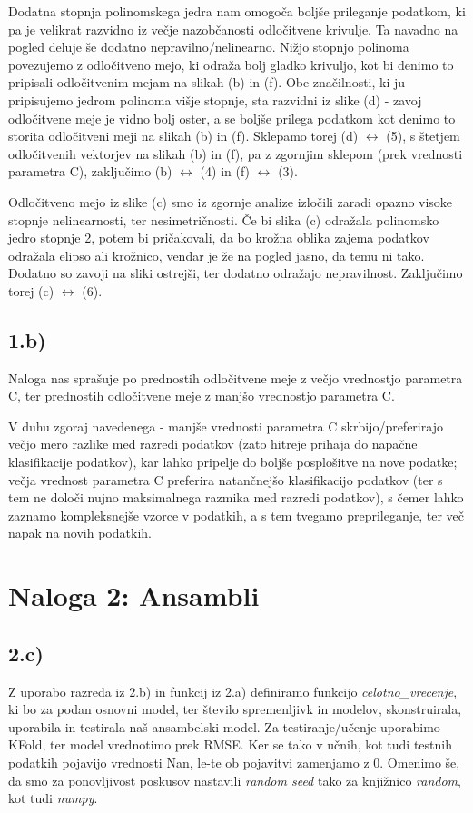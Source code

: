 \documentclass{article}
\begin{document}
Dodatna stopnja polinomskega jedra nam omogoča boljše prileganje podatkom, ki pa je velikrat razvidno iz večje nazobčanosti odločitvene krivulje. Ta navadno na pogled deluje še dodatno nepravilno/nelinearno. 
Nižjo stopnjo polinoma povezujemo z odločitveno mejo, ki odraža bolj gladko krivuljo, kot bi denimo to pripisali odločitvenim mejam na slikah (b) in (f).
Obe značilnosti, ki ju pripisujemo jedrom polinoma višje stopnje, sta razvidni iz slike (d) - zavoj odločitvene meje je vidno bolj oster, a se boljše prilega podatkom kot denimo to storita odločitveni meji na slikah (b) in (f). 
Sklepamo torej (d) $\leftrightarrow$ (5), s štetjem odločitvenih vektorjev na slikah (b) in (f), pa z zgornjim sklepom (prek vrednosti parametra C), zaključimo (b) $\leftrightarrow$ (4) in (f) $\leftrightarrow$ (3).

Odločitveno mejo iz slike (c) smo iz zgornje analize izločili zaradi opazno visoke stopnje nelinearnosti, ter nesimetričnosti. 
Če bi slika (c) odražala polinomsko jedro stopnje 2, potem bi pričakovali, da bo krožna oblika zajema podatkov odražala elipso ali krožnico, vendar je že na pogled jasno, da temu ni tako. 
Dodatno so zavoji na sliki ostrejši, ter dodatno odražajo nepravilnost. Zaključimo torej (c) $\leftrightarrow$ (6). 

\subsection*{1.b)}
Naloga nas sprašuje po prednostih odločitvene meje z večjo vrednostjo parametra C, ter prednostih odločitvene meje z manjšo vrednostjo parametra C. 

V duhu zgoraj navedenega - manjše vrednosti parametra C skrbijo/preferirajo večjo mero razlike med razredi podatkov (zato hitreje prihaja do napačne klasifikacije podatkov), kar lahko pripelje do boljše posplošitve na nove podatke; 
večja vrednost parametra C preferira natančnejšo klasifikacijo podatkov (ter s tem ne določi nujno maksimalnega razmika med razredi podatkov), s čemer lahko zaznamo kompleksnejše vzorce v podatkih, a s tem tvegamo preprileganje, ter več napak na novih podatkih.


\section*{Naloga 2: Ansambli}

\subsection*{2.c)}
Z uporabo razreda iz 2.b) in funkcij iz 2.a) definiramo funkcijo \textit{celotno\_vrecenje}, ki bo za podan osnovni model, ter število spremenljivk in modelov, skonstruirala, uporabila in testirala naš ansambelski model. 
Za testiranje/učenje uporabimo KFold, ter model vrednotimo prek RMSE. Ker se tako v učnih, kot tudi testnih podatkih pojavijo vrednosti Nan, le-te ob pojavitvi zamenjamo z $0$.  
Omenimo še, da smo za ponovljivost poskusov nastavili \textit{random seed} tako za knjižnico \textit{random}, kot tudi \textit{numpy}.
\end{document}
